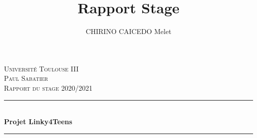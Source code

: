 \documentclass[12pt]{article}
\begin{document}
\title{Rapport Stage}
\author{CHIRINO CAICEDO Melet}
\begin{titlepage}

\newcommand{\HRule}{\rule{\linewidth}{0.5mm}} %

\center %
 

\textsc{\LARGE Université Toulouse III}\\[0.5cm] %
\textsc{\Large Paul Sabatier}\\[1.0cm] %
\textsc{\large Rapport du stage 2020/2021}\\[0.5cm] %


\HRule \\[0.4cm]
{ \huge \bfseries Projet Linky4Teens}\\[0.4cm] %
\HRule \\[1.5cm]
 



\end{titlepage}
\end{document}
